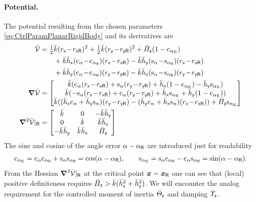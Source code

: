 \paragraph{Potential.}
The potential resulting from the chosen parameters \eqref{eq:CtrlParamPlanarRigidBody} and its derivatives are
\begin{subequations}
\begin{align}
 \potentialEnergyC &= \tfrac{1}{2} \kc (\rx\!-\!\rxR)^2 + \tfrac{1}{2} \kc (\ry\!-\!\ryR)^2 + \kapcz (1-\caE)
\nonumber\\
 &\qquad+ \kc\hcx(\ca\!-\!\caR)(\rx\!-\!\rxR) - \kc\hcy(\sa\!-\!\saR)(\rx\!-\!\rxR)
\nonumber\\
 &\qquad+ \kc\hcy(\ca\!-\!\caR)(\ry\!-\!\ryR) - \kc\hcx(\sa\!-\!\saR)(\ry\!-\!\ryR)
\label{eq:CtrlPotentialPlanarRigidBody}\\
 \differential \potentialEnergyC &= 
 \begin{bmatrix}
  \kc( \ca(\rx\!-\!\rxR) + \sa(\ry\!-\!\ryR) + \hcx(1-\caE) - \hcy\saE) \\
  \kc(-\sa(\rx\!-\!\rxR) + \ca(\ry\!-\!\ryR) + \hcx\saE + \hcy(1-\caE)) \\
  \kc( (\hcx\ca+\hcy\sa) (\ry\!-\!\ryR) - (\hcy\ca+\hcx\sa) (\rx\!-\!\rxR) ) + \kapcz\saE
 \end{bmatrix}
\\
 \differential^2 \potentialEnergyC |_{\idxRef} &=
 \begin{bmatrix}
  \kc & 0 & -\kc\hcy \\
  0 & \kc & \kc\hcx \\
  -\kc\hcy & \kc\hcx & \kapcz
 \end{bmatrix}
\end{align}
\end{subequations}
The sine and cosine of the angle error $\alpha-\alpha_{\mathsf{R}}$ are introduced just for readability
\begin{align}\label{eq:ErrorCoordPlanarRigidBody}
 \mathrm{c}_{\alpha_{\mathrm{E}}} = \mathrm{c}_{\alpha} \mathrm{c}_{\alpha_{\mathsf{R}}} + \mathrm{s}_{\alpha} \mathrm{s}_{\alpha_{\mathsf{R}}} = \cos(\alpha-\alpha_{\mathsf{R}}),
\qquad
 \mathrm{s}_{\alpha_{\mathrm{E}}} = \mathrm{s}_{\alpha} \mathrm{c}_{\alpha_{\mathsf{R}}} - \mathrm{c}_{\alpha} \mathrm{s}_{\alpha_{\mathsf{R}}} = \sin(\alpha-\alpha_{\mathsf{R}}).
\end{align}
From the Hessian $\boldsymbol{\nabla}^2 \bar{\mathcal{V}} |_{\mathsf{R}}$ at the critical point $\boldsymbol{x}=\boldsymbol{x}_{\mathsf{R}}$ one can see that (local) positive definiteness requires $\bar{\varPi}_{\mathsf{z}} > \bar{k} (\bar{h}_{\mathsf{x}}^2+\bar{h}_{\mathsf{y}}^2)$.
We will encounter the analog requirement for the controlled moment of inertia $\bar{\varTheta}_{\mathsf{z}}$ and damping $\bar{\varUpsilon}_{\mathsf{z}}$.

